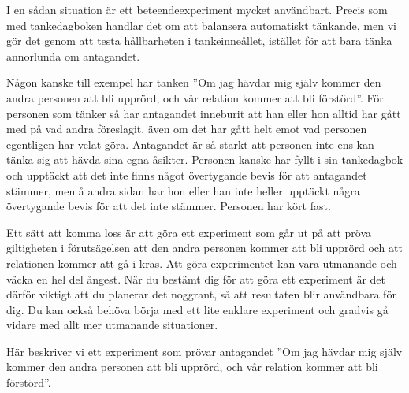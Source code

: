 \documentclass[swedish,a4paper]{book}
\begin{document}
I en sådan situation är ett beteendeexperiment mycket användbart. Precis som med tankedagboken handlar det om att balansera automatiskt tänkande, men vi gör det genom att testa hållbarheten i tankeinneållet, istället för att bara tänka annorlunda om antagandet.

Någon kanske till exempel har tanken ''Om jag hävdar mig själv kommer den andra personen att bli upprörd, och vår relation kommer att bli förstörd''. För personen som tänker så har antagandet inneburit att han eller hon alltid har gått med på vad andra föreslagit, även om det har gått helt emot vad personen egentligen har velat göra. Antagandet är så starkt att personen inte ens kan tänka sig att hävda sina egna åsikter. Personen kanske har fyllt i sin tankedagbok och upptäckt att det inte finns något övertygande bevis för att antagandet stämmer, men å andra sidan har hon eller han inte heller upptäckt några övertygande bevis för att det inte stämmer. Personen har kört fast.

Ett sätt att komma loss är att göra ett experiment som går ut på att pröva giltigheten i förutsägelsen att den andra personen kommer att bli upprörd och att relationen kommer att gå i kras. Att göra experimentet kan vara utmanande och väcka en hel del ångest. När du bestämt dig för att göra ett experiment är det därför viktigt att du planerar det noggrant, så att resultaten blir användbara för dig. Du kan också behöva börja med ett lite enklare experiment och gradvis gå vidare med allt mer utmanande situationer.

Här beskriver vi ett experiment som prövar antagandet ''Om jag hävdar mig själv kommer den andra personen att bli upprörd, och vår relation kommer att bli förstörd''.
\end{document}
